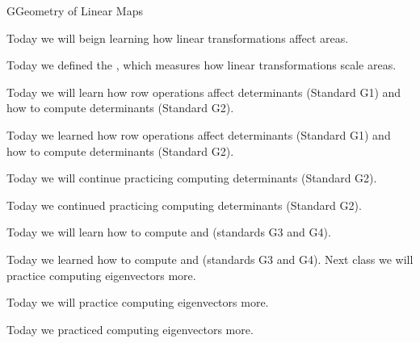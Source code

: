 \begin{module}{G}{Geometry of Linear Maps}








\newModuleSection
\begin{goals}
Today we will beign learning how linear transformations affect areas.
\end{goals}
\begin{summary}
Today we defined the , which measures how linear transformations scale areas.
\end{summary}

\newModuleSection
\begin{goals}
Today we will learn how row operations affect determinants (Standard G1) and how to compute determinants (Standard G2).
\end{goals}
\begin{summary}
Today we learned how row operations affect determinants (Standard G1) and how to compute determinants (Standard G2).
\end{summary}

\newModuleSection
\begin{goals}
Today we will continue practicing computing determinants (Standard G2).
\end{goals}
\begin{summary}
Today we continued practicing computing determinants (Standard G2).
\end{summary}

\newModuleSection
\begin{goals}
Today we will learn how to compute  and  (standards G3 and G4).
\end{goals}
\begin{summary}
Today we learned how to compute  and  (standards G3 and G4).
\vfill
Next class we will practice computing eigenvectors more.
\end{summary}

\newModuleSection
\begin{goals}
Today we will practice computing eigenvectors more.
\end{goals}
\begin{summary}
Today we practiced computing eigenvectors more.
\end{summary}


\end{module}
